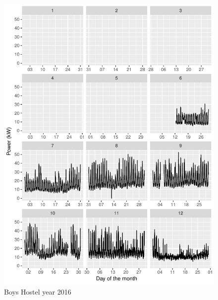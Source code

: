 \documentclass[11pt, oneside]{article}   	%
\begin{document}
\begin{figure}
\includegraphics[keepaspectratio]{boys_hostel_year2016.pdf}
\caption{Boys Hostel year 2016}
\end{figure}
\end{document}
